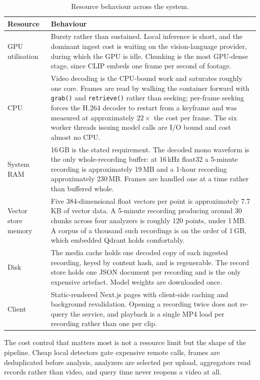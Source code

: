 \documentclass[11pt,a4paper]{article}
\begin{document}
\begin{table}[htbp]
\centering
\small
\begin{tabularx}{\textwidth}{@{}L{2.9cm}X@{}}
\toprule
\textbf{Resource} & \textbf{Behaviour} \\
\midrule
GPU utilisation & Bursty rather than sustained. Local inference is short, and the dominant ingest cost is waiting on the vision-language provider, during which the GPU is idle. Chunking is the most GPU-dense stage, since CLIP embeds one frame per second of footage. \\
CPU & Video decoding is the CPU-bound work and saturates roughly one core. Frames are read by walking the container forward with \texttt{grab()} and \texttt{retrieve()} rather than seeking; per-frame seeking forces the H.264 decoder to restart from a keyframe and was measured at approximately $22\times$ the cost per frame. The six worker threads issuing model calls are I/O bound and cost almost no CPU. \\
System RAM & 16\,GB is the stated requirement. The decoded mono waveform is the only whole-recording buffer: at 16\,kHz float32 a 5-minute recording is approximately 19\,MB and a 1-hour recording approximately 230\,MB. Frames are handled one at a time rather than buffered whole. \\
Vector store memory & Five 384-dimensional float vectors per point is approximately 7.7\,KB of vector data. A 5-minute recording producing around 30 chunks across four analyzers is roughly 120 points, under 1\,MB. A corpus of a thousand such recordings is on the order of 1\,GB, which embedded Qdrant holds comfortably. \\
Disk & The media cache holds one decoded copy of each ingested recording, keyed by content hash, and is regenerable. The record store holds one JSON document per recording and is the only expensive artefact. Model weights are downloaded once. \\
Client & Static-rendered Next.js pages with client-side caching and background revalidation. Opening a recording twice does not re-query the service, and playback is a single MP4 load per recording rather than one per clip. \\
\bottomrule
\end{tabularx}
\caption{Resource behaviour across the system.}
\end{table}

The cost control that matters most is not a resource limit but the shape of the
pipeline. Cheap local detectors gate expensive remote calls, frames are
deduplicated before analysis, analyzers are selected per upload, aggregators read
records rather than video, and query time never reopens a video at all.
\end{document}
